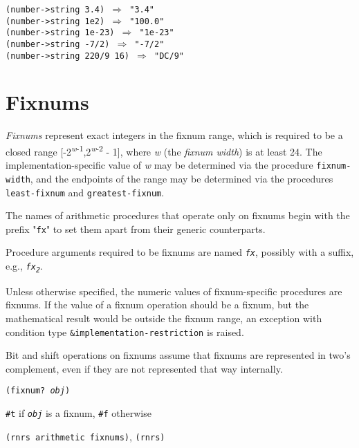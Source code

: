 \begin{alltt}
(number-\textgreater{}string 3.4) \(\Rightarrow\) "3.4"
(number-\textgreater{}string 1e2) \(\Rightarrow\) "100.0"
(number-\textgreater{}string 1e-23) \(\Rightarrow\) "1e-23"
(number-\textgreater{}string -7/2) \(\Rightarrow\) "-7/2"
(number-\textgreater{}string 220/9 16) \(\Rightarrow\) "DC/9"
\end{alltt}

\section{\label{objects_g111}\label{objects_h5}Fixnums\label{objects_SECTFIXNUMS}}



\label{objects_s149}\textit{Fixnums} represent exact integers in the fixnum range, which is
required to be a closed range [-2\textsuperscript{\textit{w}-1},2\textsuperscript{\textit{w}-2} - 1], where \textit{w} (the
\textit{fixnum width}) is at least 24.
The implementation-specific value of \textit{w} may be determined via the
procedure \texttt{fixnum-width}, and the endpoints of the range may
be determined via the procedures \texttt{least-fixnum} and
\texttt{greatest-fixnum}.


The names of arithmetic procedures that operate only on fixnums
begin with the prefix "\texttt{fx}" to set them apart from their generic
counterparts.


Procedure arguments required to be fixnums are named \texttt{\textit{fx}}, possibly
with a suffix, e.g., \texttt{\textit{fx\textsubscript{2}}}.


Unless otherwise specified, the numeric values of fixnum-specific
procedures are fixnums.
If the value of a fixnum operation should be a fixnum, but the
mathematical result would be outside the fixnum range, an exception
with condition type \texttt{\&{}implementation-restriction} is raised.


Bit and shift operations on fixnums assume that fixnums are represented in
two's complement, even if they are not represented that way internally.

\begin{description}

\label{objects_s150}\item[procedure] \texttt{(fixnum? \textit{obj})}



\item[returns] \texttt{\#{}t} if \texttt{\textit{obj}} is a fixnum, \texttt{\#{}f} otherwise


\item[libraries] \texttt{(rnrs arithmetic fixnums)}, \texttt{(rnrs)}
\end{description}


